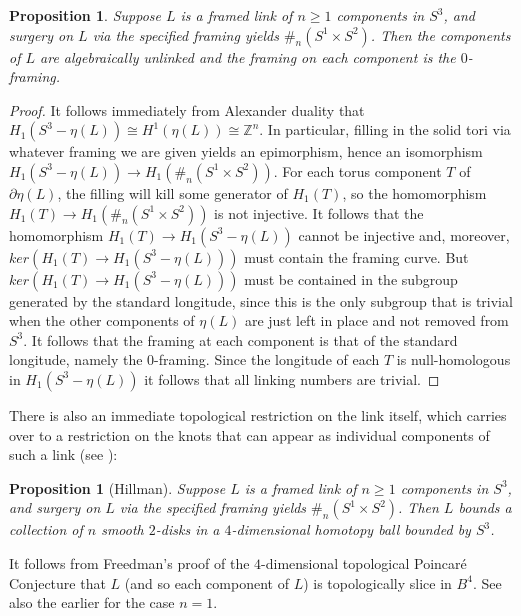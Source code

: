 \documentclass{amsart}
\newtheorem{prop}[thm]{Proposition}
\newcommand{\bdd}{\mbox{$\partial$}}
\begin{document}
\begin{prop} \label{prop:frame}  Suppose $L$ is a framed link of $n \geq 1$ components in $S^3$, and surgery on $L$ via the specified framing yields $\#_{n} (S^{1} \times S^{2})$.  Then the components of $L$ are algebraically unlinked and the framing on each component is the $0$-framing.
\end{prop}

\begin{proof}  It follows immediately from Alexander duality that $H_1(S^3 - \eta(L)) \cong H^1(\eta(L)) \cong\mathbb{Z}^n.$  In particular, filling in the solid tori via whatever framing we are given yields an epimorphism, hence an isomorphism $H_1(S^3 - \eta(L)) \to H_1(\#_{n} (S^{1} \times S^{2}))$.  For each torus component $T$ of $\bdd \eta(L)$, the filling will kill some generator of $H_1(T)$, so the homomorphism $H_1(T) \to H_1(\#_{n} (S^{1} \times S^{2}))$ is not injective.  It follows that the homomorphism $H_1(T) \to H_1(S^3 - \eta(L))$ cannot be injective and, moreover, $ker(H_1(T) \to H_1(S^3 - \eta(L)))$ must contain the framing curve.  But $ker(H_1(T) \to H_1(S^3 - \eta(L)))$ must be contained in the subgroup generated by the standard longitude, since this is the only subgroup that is trivial when the other components of $\eta(L)$ are just left in place and not removed from $S^3$.  It follows that the framing at each component is that of the standard longitude, namely the $0$-framing.   Since the longitude of each $T$ is null-homologous in $H_1(S^3 - \eta(L))$ it follows that all linking numbers are trivial.
\end{proof}

There is also an immediate topological restriction on the link itself, which carries over to a restriction on the knots that can appear as individual components of such a link (see \cite[Theorem 2]{Hi}):

\begin{prop}[Hillman] \label{prop:slice}  Suppose $L$ is a framed link of $n \geq 1$ components in $S^3$, and surgery on $L$ via the specified framing yields $\#_{n} (S^{1} \times S^{2})$.  Then $L$ bounds a collection of $n$ smooth $2$-disks in a $4$-dimensional homotopy ball bounded by $S^3$.
\end{prop}

It follows from Freedman's proof of the $4$-dimensional topological Poincar\'e Conjecture \cite{Fr} that $L$ (and so each component of $L$) is topologically slice in $B^4$.  See also the earlier \cite{KM} for the case $n = 1$.
\end{document}
